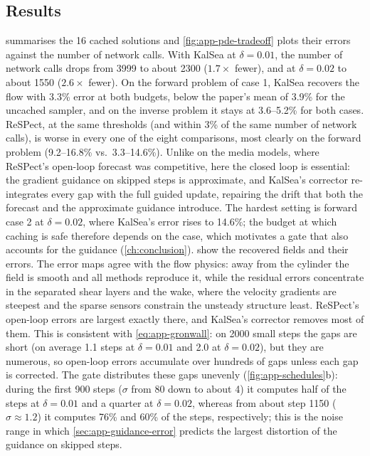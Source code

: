 \subsection{Results}
 summarises the 16 cached solutions and \cref{fig:app-pde-tradeoff} plots their errors against the number of network calls. With KalSea at $\delta=0.01$, the number of network calls drops from 3999 to about 2300 ($1.7\times$ fewer), and at $\delta=0.02$ to about 1550 ($2.6\times$ fewer). On the forward problem of case 1, KalSea recovers the flow with 3.3\% error at both budgets, below the paper's mean of 3.9\% for the uncached sampler, and on the inverse problem it stays at 3.6--5.2\% for both cases. ReSPect, at the same thresholds (and within 3\% of the same number of network calls), is worse in every one of the eight comparisons, most clearly on the forward problem (9.2--16.8\% vs.\ 3.3--14.6\%). Unlike on the media models, where ReSPect's open-loop forecast was competitive, here the closed loop is essential: the gradient guidance on skipped steps is approximate, and KalSea's corrector re-integrates every gap with the full guided update, repairing the drift that both the forecast and the approximate guidance introduce. The hardest setting is forward case 2 at $\delta=0.02$, where KalSea's error rises to 14.6\%; the budget at which caching is safe therefore depends on the case, which motivates a gate that also accounts for the guidance (\cref{ch:conclusion}).  show the recovered fields and their errors. The error maps agree with the flow physics: away from the cylinder the field is smooth and all methods reproduce it, while the residual errors concentrate in the separated shear layers and the wake, where the velocity gradients are steepest and the sparse sensors constrain the unsteady structure least. ReSPect's open-loop errors are largest exactly there, and KalSea's corrector removes most of them. This is consistent with \cref{eq:app-gronwall}: on 2000 small steps the gaps are short (on average 1.1 steps at $\delta=0.01$ and 2.0 at $\delta=0.02$), but they are numerous, so open-loop errors accumulate over hundreds of gaps unless each gap is corrected. The gate distributes these gaps unevenly (\cref{fig:app-schedules}b): during the first 900 steps ($\sigma$ from 80 down to about 4) it computes half of the steps at $\delta=0.01$ and a quarter at $\delta=0.02$, whereas from about step 1150 ($\sigma\approx1.2$) it computes 76\% and 60\% of the steps, respectively; this is the noise range in which \cref{sec:app-guidance-error} predicts the largest distortion of the guidance on skipped steps.

